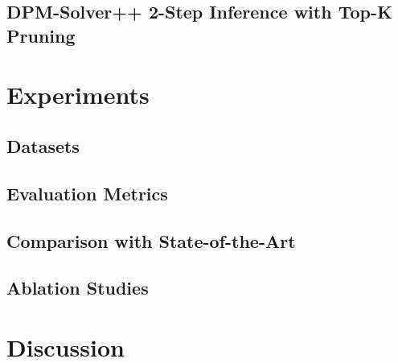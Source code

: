 \documentclass[journal,10pt]{IEEEtran}
\begin{document}
\subsection{DPM-Solver++ 2-Step Inference with Top-K Pruning}

\section{Experiments}
\label{sec:exp}

\subsection{Datasets}

\subsection{Evaluation Metrics}

\subsection{Comparison with State-of-the-Art}

\subsection{Ablation Studies}

\section{Discussion}
\label{sec:discussion}
\end{document}
